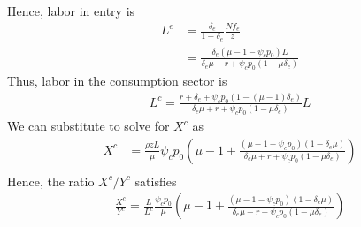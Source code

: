 \documentclass[authoryear, review, 12pt]{elsarticle}
\begin{document}
	Hence, labor in entry is
	\begin{align}
		L^e&=\frac{\delta_e}{1-\delta_e}\frac{Nf_e}{z}\\
		&=\frac{\delta_e(\mu-1-\psi_c p_0)L}{\delta_e \mu+r+\psi_c p_0(1-\mu \delta_e)}
	\end{align}
	Thus, labor in the consumption sector is
	\begin{align}
		L^c=\frac{r+\delta_e+\psi_c p_0(1-(\mu-1)\delta_e)}{\delta_e\mu+r+\psi_c p_0(1-\mu \delta_e)}L
	\end{align}
	We can substitute to solve for $X^c$ as
	\begin{align}
		X^c&=\frac{\rho z L}{\mu}\psi_c p_0\left(\mu-1+\frac{(\mu-1-\psi_c p_0)(1-\delta_e \mu)}{\delta_e \mu+r+\psi_c p_0(1-\mu \delta_e)}\right)\\
	\end{align}
	Hence, the ratio $X^c/Y^c$ satisfies
	\begin{align}
		\frac{X^c}{Y^c}=\frac{L}{L^c}\frac{\psi_c p_0}{\mu}\left(\mu-1+\frac{(\mu-1-\psi_cp_0)(1-\delta_e \mu)}{\delta_e \mu+r+\psi_c p_0(1-\mu \delta_e)}\right)
	\end{align}
\end{document}
